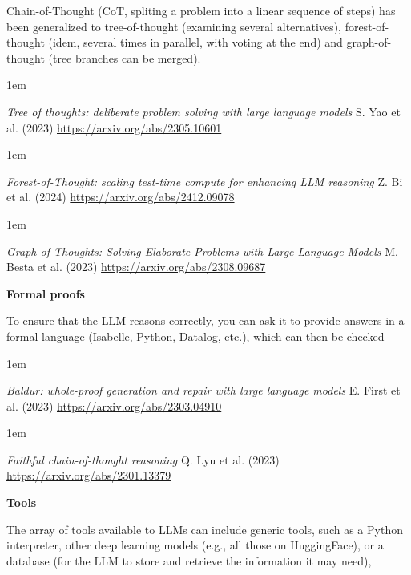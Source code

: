 \documentclass[a5paper]{article}
\newenvironment{reference}{%
  \medskip\goodbreak
  \parskip 0pt
  \raggedright
  \leftskip 1em
  \obeylines
}{\par\medskip\goodbreak}
\def\subsection#1{{\par\bigskip\goodbreak\large\bfseries #1\par}}
\begin{document}
Chain-of-Thought (CoT, spliting a problem into a linear sequence of steps)
has been generalized to tree-of-thought (examining several alternatives),
forest-of-thought (idem, several times in parallel, with voting at the end)
and graph-of-thought (tree branches can be merged).

\begin{reference}
  \emph{Tree of thoughts: deliberate problem solving with large language models}
  S. Yao et al. (2023)
  \url{https://arxiv.org/abs/2305.10601}
\end{reference}

\begin{reference}
  \emph{Forest-of-Thought: scaling test-time compute for enhancing LLM reasoning}
  Z. Bi et al. (2024)
  \url{https://arxiv.org/abs/2412.09078}
\end{reference}

\begin{reference}
  \emph{Graph of Thoughts: Solving Elaborate Problems with Large Language Models}
  M. Besta et al. (2023)
  \url{https://arxiv.org/abs/2308.09687}
\end{reference}

\subsection{Formal proofs}

To ensure that the LLM reasons correctly,
you can ask it to provide answers in a formal language
(Isabelle, Python, Datalog, etc.),
which can then be checked

\begin{reference}
  \emph{Baldur: whole-proof generation and repair with large language models}
  E. First et al. (2023)
  \url{https://arxiv.org/abs/2303.04910}
\end{reference}

\begin{reference}
  \emph{Faithful chain-of-thought reasoning}
  Q. Lyu et al. (2023)
  \url{https://arxiv.org/abs/2301.13379}
\end{reference}

\subsection{Tools}

The array of tools available to LLMs can include generic tools, such as
a Python interpreter,
other deep learning models (e.g., all those on HuggingFace),
or a database (for the LLM to store and retrieve the information it may need),
\end{document}
